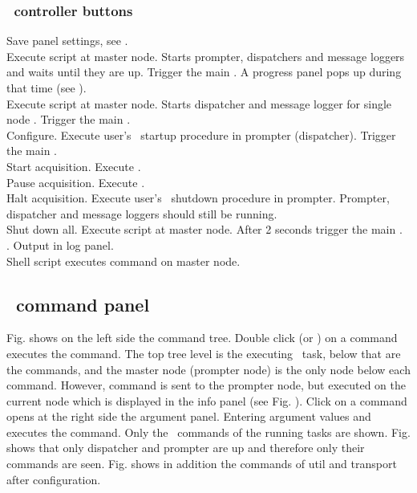 \subsubsection[MBS controller buttons]{\mbs\  controller buttons}
 Save panel settings, see .\\
  Execute script  at master node.
Starts prompter, dispatchers and message loggers and waits until they are up.
Trigger the main .
A progress panel pops up during that time (see ).\\
 Execute script  at master node.
Starts dispatcher and message logger for single node \mbs.
Trigger the main .\\
 Configure. Execute user's \mbs\ startup procedure in prompter (dispatcher).
Trigger the main .\\
 Start acquisition. Execute .\\
 Pause acquisition. Execute .\\
 Halt acquisition. Execute user's \mbs\ shutdown procedure in prompter.
Prompter, dispatcher and message loggers should still be running.\\
 Shut down all. Execute script  at master node.
After 2 seconds trigger the main .\\
 . Output in log panel.\\
 Shell script executes command on master node.


\subsection[MBS command panel]{\mbs\ command panel}
Fig.  shows
on the left side the command tree. Double click (or ) on a command
executes the command. The top tree level is the executing \mbs\ task,
below that are the commands, and the master node (prompter node) is the only node
below each command. However,
command is sent to the prompter node, but executed on the current node 
which is displayed in the info panel
(see Fig. ).
Click on a command opens at the right side the argument panel.
Entering argument values and  executes the command.
Only the \mbs\ commands of the running tasks are shown. 
Fig.  shows that only dispatcher and prompter are up
and therefore only their commands are seen.
Fig.  shows in addition the commands
of util and transport after configuration.
